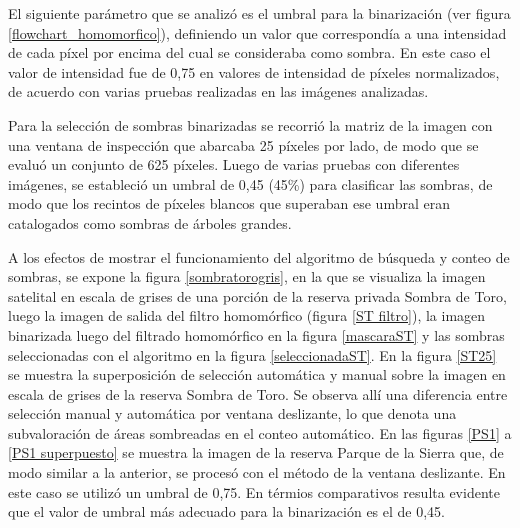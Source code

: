 El siguiente parámetro que se analizó es el umbral para la binarización (ver figura \ref{flowchart_homomorfico}), definiendo un valor que correspondía a una intensidad de cada píxel por encima del cual se consideraba como sombra. En este caso el valor de intensidad fue de 0,75 en valores de intensidad de píxeles normalizados, de acuerdo con varias pruebas realizadas en las imágenes analizadas.

Para la selección de sombras binarizadas se recorrió la matriz de la imagen con una ventana de inspección que abarcaba 25 píxeles por lado, de modo que se evaluó un conjunto de 625 píxeles. Luego de varias pruebas con diferentes imágenes, se estableció un umbral de 0,45 (45\%) para clasificar las sombras, de modo que los recintos de píxeles blancos que superaban ese umbral eran catalogados como sombras de árboles grandes.

A los efectos de mostrar el funcionamiento del algoritmo de búsqueda y conteo de sombras, se expone la figura \ref{sombratorogris}, en la que se visualiza la imagen satelital en escala de grises de una porción de la reserva privada Sombra de Toro, luego la imagen de salida del filtro homomórfico (figura \ref{ST filtro}), la imagen binarizada luego del filtrado homomórfico en la figura \ref{mascaraST} y las sombras seleccionadas con el algoritmo en la figura \ref{seleccionadaST}. En la figura \ref{ST25} se muestra la superposición de selección automática y manual sobre la imagen en escala de grises de la reserva Sombra de Toro. Se observa allí una diferencia entre selección manual y automática por ventana deslizante, lo que denota una subvaloración de áreas sombreadas en el conteo automático.
En las figuras \ref{PS1} a \ref{PS1 superpuesto} se muestra la imagen de la reserva Parque de la Sierra que, de modo similar a la anterior, se procesó con el método de la ventana deslizante. En este caso se utilizó un umbral de 0,75. En térmios comparativos resulta evidente que el valor de umbral más adecuado para la binarización es el de 0,45.




